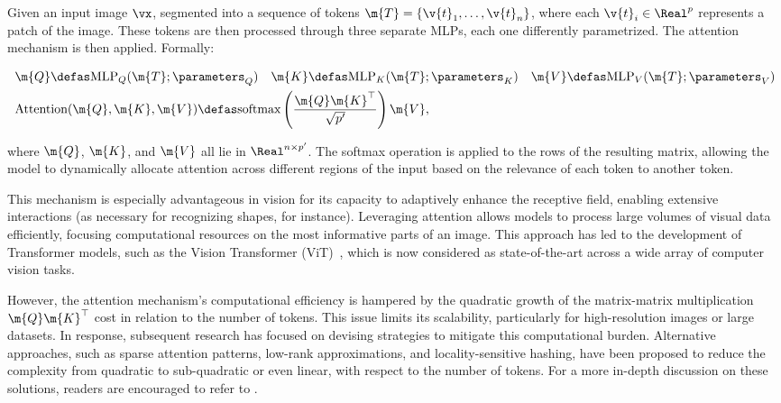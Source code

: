 \begin{definition}
    
Given an input image $\vx$, segmented into a sequence of tokens $\m{T} = \{ \v{t}_1, \ldots, \v{t}_n \}$, where each $\v{t}_i \in \Real^p$ represents a patch of the image. These tokens are then processed through three separate MLPs, each one differently parametrized. The attention mechanism is then applied. Formally:

\begin{align*}
&\m{Q} \defas \text{MLP}_Q(\m{T}; \parameters_Q) ~~~
\m{K} \defas \text{MLP}_K(\m{T}; \parameters_K) ~~~
\m{V} \defas \text{MLP}_V(\m{T}; \parameters_V) \\
&\text{Attention}(\m{Q}, \m{K}, \m{V}) \defas \text{softmax}\left(\frac{\m{Q}\m{K}^\top}{\sqrt{p'}}\right)\m{V},
\end{align*}

where $\m{Q}$, $\m{K}$, and $\m{V}$ all lie in $\Real^{n \times p'}$. The softmax operation is applied to the rows of the resulting matrix, allowing the model to dynamically allocate attention across different regions of the input based on the relevance of each token to another token.

\end{definition}


This mechanism is especially advantageous in vision for its capacity to adaptively enhance the receptive field, enabling extensive interactions (as necessary for recognizing shapes, for instance). Leveraging attention allows models to process large volumes of visual data efficiently, focusing computational resources on the most informative parts of an image. This approach has led to the development of Transformer models, such as the Vision Transformer (ViT)~\cite{dosovitskiy2020image}, which is now considered as state-of-the-art across a wide array of computer vision tasks.

However, the attention mechanism's computational efficiency is hampered by the quadratic growth of the matrix-matrix multiplication $\m{Q}\m{K}^\top$ cost in relation to the number of tokens. This issue limits its scalability, particularly for high-resolution images or large datasets. In response, subsequent research has focused on devising strategies to mitigate this computational burden. Alternative approaches, such as sparse attention patterns, low-rank approximations, and locality-sensitive hashing, have been proposed to reduce the complexity from quadratic to sub-quadratic or even linear, with respect to the number of tokens. For a more in-depth discussion on these solutions, readers are encouraged to refer to \cite{zhang2023cab}.

